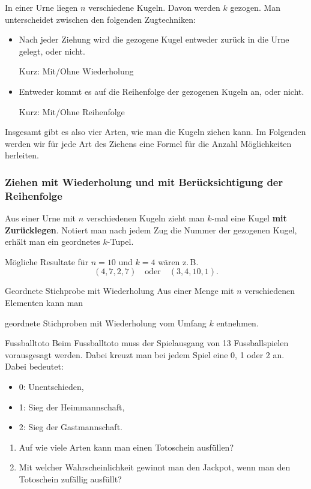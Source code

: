 In einer Urne liegen \(n\) verschiedene Kugeln. Davon werden \(k\) gezogen. Man unterscheidet zwischen den folgenden Zugtechniken:
\begin{itemize}
    \item Nach jeder Ziehung wird die gezogene Kugel entweder zurück in die Urne gelegt, oder nicht.

          Kurz: Mit/Ohne Wiederholung
    \item Entweder kommt es auf die Reihenfolge der gezogenen Kugeln an, oder nicht.

          Kurz: Mit/Ohne Reihenfolge
\end{itemize}

Insgesamt gibt es also vier Arten, wie man die Kugeln ziehen kann. Im Folgenden werden wir für jede Art des Ziehens eine Formel für die Anzahl Möglichkeiten herleiten.

\subsubsection{Ziehen mit Wiederholung und mit Berücksichtigung der Reihenfolge}
Aus einer Urne mit \(n\) verschiedenen Kugeln zieht man \(k\)-mal eine Kugel \textbf{mit Zurücklegen}. Notiert man nach jedem Zug die Nummer der gezogenen Kugel, erhält man ein geordnetes \(k\)-Tupel.

Mögliche Resultate für \(n = 10\) und \(k = 4\) wären z.\,B.
\[
    (4,7,2,7) \quad \text{oder} \quad (3,4,10,1).
\]

\begin{satz}
    {Geordnete Stichprobe mit Wiederholung}{}
    Aus einer Menge mit \(n\) verschiedenen Elementen kann man

    \vspace{2cm}

    geordnete Stichproben mit Wiederholung vom Umfang \(k\) entnehmen.

\end{satz}

\begin{bsp}
    {Fussballtoto}{}
    Beim Fussballtoto muss der Spielausgang von 13 Fussballspielen vorausgesagt werden. Dabei kreuzt man bei jedem Spiel eine 0, 1 oder 2 an. Dabei bedeutet:
    \begin{itemize}
        \item 0: Unentschieden,
        \item 1: Sieg der Heimmannschaft,
        \item 2: Sieg der Gastmannschaft.
    \end{itemize}

    \begin{enumerate}
        \item Auf wie viele Arten kann man einen Totoschein ausfüllen?
              \vspace{2cm}
        \item Mit welcher Wahrscheinlichkeit gewinnt man den Jackpot, wenn man den Totoschein zufällig ausfüllt?
              \vspace{2cm}
    \end{enumerate}
\end{bsp}

